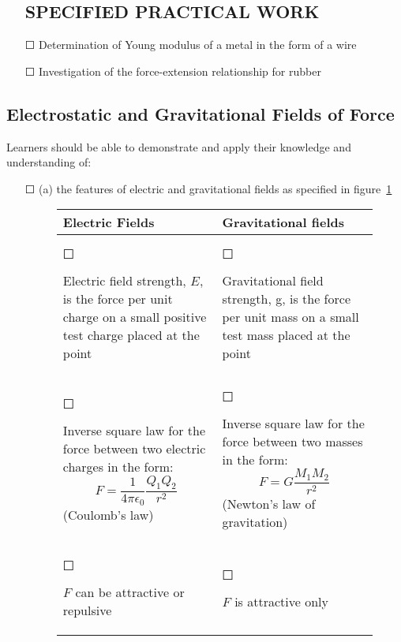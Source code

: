 \begin{itemize}
	\subsection*{SPECIFIED PRACTICAL WORK}
	\item[\Large{$\Square$}] Determination of Young modulus of a metal in the form of a wire
	\item[\Large{$\Square$}] Investigation of the force-extension relationship for rubber
\end{itemize}
\subsection{Electrostatic and Gravitational Fields of Force}Learners should be able to demonstrate and apply their knowledge and
understanding of:
\begin{itemize}
	\item[\Large{$\Square$}] (a) the features of electric and gravitational fields as specified in figure~\ref{fieldtab}
	\begin{figure}
		\centering
		\label{fieldtab}
		\begin{tabular}{p{} p{}}
			\toprule
			\textbf{Electric Fields}                                                 & \textbf{Gravitational fields}    \\ \midrule
			\begin{Large}$\Square$\end{Large} Electric field strength, $E$, is the force per unit charge on a small positive test charge placed at the point     & \begin{Large}$\Square$\end{Large} Gravitational field strength, g, is the force per
			unit mass on a small test mass placed at the
			point                                        \\ \midrule
			\begin{Large}$\Square$\end{Large} Inverse square law for the force between two electric charges in the form: \[F=\frac{1}{4 \pi \epsilon_{0}}\frac{Q_{1}Q_{2}}{r^2}\]
			(Coulomb's law) & \begin{Large}$\Square$\end{Large} Inverse square law for the force between two masses in the form: \[F=G\frac{M_{1}M_{2}}{r^2}\]
			(Newton's law of gravitation) \\ \midrule
			\begin{Large}$\Square$\end{Large} $F$ can be attractive or repulsive       & \begin{Large}$\Square$\end{Large} $F$ is attractive only                                                                                                                      \\ \midrule

\end{tabular}
\end{figure}
\end{itemize}
